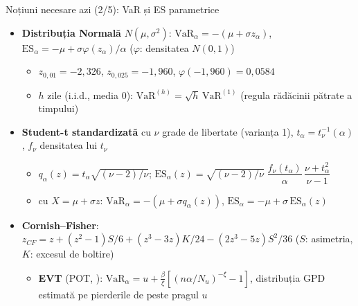 \begin{frame}{Noțiuni necesare azi (2/5): VaR și ES parametrice}
\itemsize{\small}
\begin{itemize}
    \item \textbf{Distribuția Normală} $N(\mu, \sigma^2)$: $\mathrm{VaR}_\alpha = -(\mu + \sigma z_\alpha)$, $\mathrm{ES}_\alpha = -\mu + \sigma\varphi(z_\alpha)/\alpha$ ($\varphi$: densitatea $N(0,1)$)
    \begin{itemize}
        \item $z_{0{,}01} = -2{,}326$, $z_{0{,}025} = -1{,}960$, $\varphi(-1{,}960) = 0{,}0584$
        \item $h$ zile (i.i.d., media 0): $\mathrm{VaR}^{(h)} = \sqrt{h}\,\mathrm{VaR}^{(1)}$ (regula rădăcinii pătrate a timpului)
    \end{itemize}
    \item \textbf{Student-t standardizată} cu $\nu$ grade de libertate (varianța 1), $t_\alpha = t_\nu^{-1}(\alpha)$, $f_\nu$ densitatea lui $t_\nu$
    \begin{itemize}
        \item $q_\alpha(z) = t_\alpha\sqrt{(\nu - 2)/\nu}$; \quad $\mathrm{ES}_\alpha(z) = \sqrt{(\nu - 2)/\nu}\;\dfrac{f_\nu(t_\alpha)}{\alpha}\,\dfrac{\nu + t_\alpha^2}{\nu - 1}$
        \item cu $X = \mu + \sigma z$: $\mathrm{VaR}_\alpha = -(\mu + \sigma q_\alpha(z))$, $\mathrm{ES}_\alpha = -\mu + \sigma\,\mathrm{ES}_\alpha(z)$
    \end{itemize}
    \item \textbf{Cornish--Fisher}: $z_{CF} = z + (z^2 - 1)S/6 + (z^3 - 3z)K/24 - (2z^3 - 5z)S^2/36$ ($S$: asimetria, $K$: excesul de boltire)
    \begin{itemize}
        \item \textbf{EVT} (POT, ): $\mathrm{VaR}_\alpha = u + \frac{\beta}{\xi}[(n\alpha/N_u)^{-\xi} - 1]$, distribuția GPD estimată pe pierderile de peste pragul $u$
    \end{itemize}
\end{itemize}
\end{frame}

